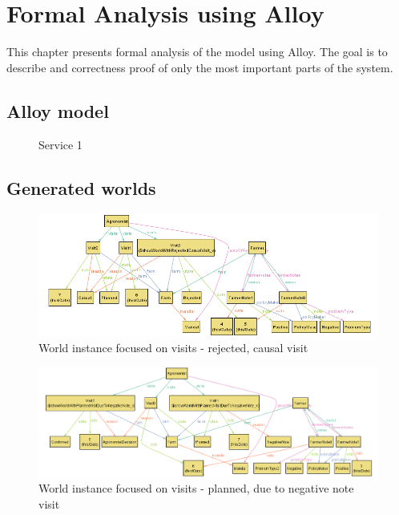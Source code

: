 \chapter{Formal Analysis using Alloy}
This chapter presents formal analysis of the model using Alloy. The goal is to describe and correctness proof of only the most important parts of the system. 

\section{Alloy model}
\begin{figure}[h]

\caption{Service 1}
\end{figure}


\section{Generated worlds}
\begin{figure}[H]
    \centering
    \includegraphics[width=\textwidth, keepaspectratio, origin=c]{alloy/world_instances/showWorldWithRejectedCasualVisit2.png}
    \caption{World instance focused on visits - rejected, causal visit}
    \label{fig:rejected_causal}
\end{figure}

\begin{figure}[H]
    \centering
    \includegraphics[width=\textwidth, keepaspectratio, origin=c]{alloy/world_instances/showWorldWithPlannedVisitDueToNegativeNote2.png}
    \caption{World instance focused on visits - planned, due to negative note visit}
    \label{fig:planned_negative_note}
\end{figure}

